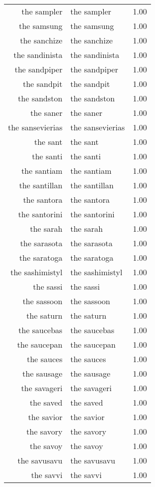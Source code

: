 \begin{table}[ht]
\begin{tabular}{rlr}
  the sampler & the sampler & 1.00 \\ 
  the samsung & the samsung & 1.00 \\ 
  the sanchize & the sanchize & 1.00 \\ 
  the sandinista & the sandinista & 1.00 \\ 
  the sandpiper & the sandpiper & 1.00 \\ 
  the sandpit & the sandpit & 1.00 \\ 
  the sandston & the sandston & 1.00 \\ 
  the saner & the saner & 1.00 \\ 
  the sansevierias & the sansevierias & 1.00 \\ 
  the sant & the sant & 1.00 \\ 
  the santi & the santi & 1.00 \\ 
  the santiam & the santiam & 1.00 \\ 
  the santillan & the santillan & 1.00 \\ 
  the santora & the santora & 1.00 \\ 
  the santorini & the santorini & 1.00 \\ 
  the sarah & the sarah & 1.00 \\ 
  the sarasota & the sarasota & 1.00 \\ 
  the saratoga & the saratoga & 1.00 \\ 
  the sashimistyl & the sashimistyl & 1.00 \\ 
  the sassi & the sassi & 1.00 \\ 
  the sassoon & the sassoon & 1.00 \\ 
  the saturn & the saturn & 1.00 \\ 
  the saucebas & the saucebas & 1.00 \\ 
  the saucepan & the saucepan & 1.00 \\ 
  the sauces & the sauces & 1.00 \\ 
  the sausage & the sausage & 1.00 \\ 
  the savageri & the savageri & 1.00 \\ 
  the saved & the saved & 1.00 \\ 
  the savior & the savior & 1.00 \\ 
  the savory & the savory & 1.00 \\ 
  the savoy & the savoy & 1.00 \\ 
  the savusavu & the savusavu & 1.00 \\ 
  the savvi & the savvi & 1.00 \\ 

\end{tabular}
\end{table}
